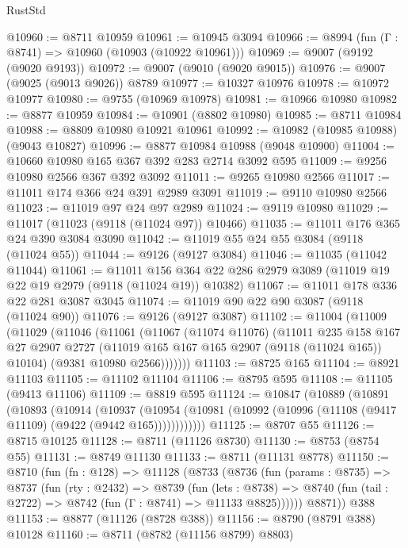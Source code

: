\begin{lexlean}{RustStd}
\begin{coremodule}
@10960 := @8711 @10959
@10961 := @10945 @3094
@10966 := @8994 (fun (Γ : @8741) => @10960 (@10903 (@10922 @10961)))
@10969 := @9007 (@9192 (@9020 @9193))
@10972 := @9007 (@9010 (@9020 @9015))
@10976 := @9007 (@9025 (@9013 @9026)) @8789
@10977 := @10327 @10976
@10978 := @10972 @10977
@10980 := @9755 (@10969 @10978)
@10981 := @10966 @10980
@10982 := @8877 @10959
@10984 := @10901 (@8802 @10980)
@10985 := @8711 @10984
@10988 := @8809 @10980 @10921 @10961
@10992 := @10982 (@10985 @10988) (@9043 @10827)
@10996 := @8877 @10984 @10988 (@9048 @10900)
@11004 := @10660 @10980 @165 @367 @392 @283 @2714 @3092 @595
@11009 := @9256 @10980 @2566 @367 @392 @3092
@11011 := @9265 @10980 @2566
@11017 := @11011 @174 @366 @24 @391 @2989 @3091
@11019 := @9110 @10980 @2566
@11023 := @11019 @97 @24 @97 @2989
@11024 := @9119 @10980
@11029 := @11017 (@11023 (@9118 (@11024 @97)) @10466)
@11035 := @11011 @176 @365 @24 @390 @3084 @3090
@11042 := @11019 @55 @24 @55 @3084 (@9118 (@11024 @55))
@11044 := @9126 (@9127 @3084)
@11046 := @11035 (@11042 @11044)
@11061 := @11011
    @156
    @364
    @22
    @286
    @2979
    @3089
    (@11019 @19 @22 @19 @2979 (@9118 (@11024 @19)) @10382)
@11067 := @11011 @178 @336 @22 @281 @3087 @3045
@11074 := @11019 @90 @22 @90 @3087 (@9118 (@11024 @90))
@11076 := @9126 (@9127 @3087)
@11102 := @11004
    (@11009
      (@11029
        (@11046
          (@11061
            (@11067
              (@11074 @11076)
              (@11011
                @235
                @158
                @167
                @27
                @2907
                @2727
                (@11019 @165 @167 @165 @2907 (@9118 (@11024 @165)) @10104)
                (@9381 @10980 @2566)))))))
@11103 := @8725 @165
@11104 := @8921 @11103
@11105 := @11102 @11104
@11106 := @8795 @595
@11108 := @11105 (@9413 @11106)
@11109 := @8819 @595
@11124 := @10847
    (@10889
      (@10891
        (@10893
          (@10914
            (@10937
              (@10954 (@10981 (@10992 (@10996 (@11108 (@9417 @11109) (@9422 (@9442 @165))))))))))))
@11125 := @8707 @55
@11126 := @8715 @10125
@11128 := @8711 (@11126 @8730)
@11130 := @8753 (@8754 @55)
@11131 := @8749 @11130
@11133 := @8711 (@11131 @8778)
@11150 := @8710
    (fun (fn : @128) =>
    @11128
      (@8733
        (@8736
          (fun (params : @8735) =>
          @8737
            (fun (rty : @2432) =>
            @8739
              (fun (lets : @8738) =>
              @8740 (fun (tail : @2722) => @8742 (fun (Γ : @8741) => @11133 @8825))))))
        @8871))
    @388
@11153 := @8877 (@11126 (@8728 @388))
@11156 := @8790 (@8791 @388) @10128
@11160 := @8711 (@8782 (@11156 @8799) @8803)

\end{coremodule}
\end{lexlean}

